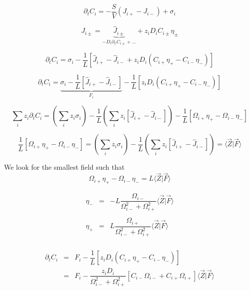 \documentclass[aps,12pt]{revtex4}
\begin{document}
\begin{equation}
	\partial_t C_i = -\dfrac{S}{V}(J_{i+}-J_{i-}) + \sigma_i
\end{equation}

\begin{equation}
	J_{i\pm} = \underbrace{\hat J_{i\pm}}_{-D_i \partial_x C_{i\pm}+\ldots} + z_i D_i C_{i\pm} \eta_\pm
\end{equation}

\begin{equation}
	\partial_t C_i = \sigma_i -\dfrac{1}{L} \left[ \hat J_{i+}- \hat J_{i-} + z_i D_i (C_{i+} \eta_+ - C_{i-} \eta_-) \right] 
\end{equation}

\begin{equation}
	\partial_t C_i = \underbrace{\sigma_i -\dfrac{1}{L} \left[ \hat J_{i+}- \hat J_{i-} \right]}_{F_i} - \dfrac{1}{L}  \left[ z_i D_i (C_{i+} \eta_+ - C_{i-} \eta_-) \right] 
\end{equation}


\begin{equation}
	\sum_i z_i \partial_t C_i = \left(\sum_i z_i \sigma_i\right) 
	-\dfrac{1}{L} \left( \sum_i z_i\left[ \hat J_{i+}- \hat J_{i-} \right]  \right)
	- \dfrac{1}{L}  \left[ \Omega_{i+} \eta_+ - \Omega_{i-} \eta_- \right] 
\end{equation}

\begin{equation}
	\dfrac{1}{L}  \left[ \Omega_{i+} \eta_+ - \Omega_{i-} \eta_- \right]  =
	\left(\sum_i z_i \sigma_i\right) 
	-\dfrac{1}{L} \left( \sum_i z_i\left[ \hat J_{i+}- \hat J_{i-} \right]  \right)
	= \langle \vec Z \vert \vec F \rangle
\end{equation}

 
We look for the smallest field such that 
\begin{equation}
\Omega_{i+} \eta_+ - \Omega_{i-} \eta_- = L \langle \vec Z \vert \vec F \rangle
\end{equation}

\begin{equation}
\begin{array}{rcl}
	\eta_- & = & - L \dfrac{\Omega_{i-}}{ \Omega_{i-}^2 + \Omega_{i+}^2} \langle \vec Z \vert \vec F \rangle \\
	\\
 	\eta_+ & = &  L \dfrac{\Omega_{i+}}{ \Omega_{i-}^2 + \Omega_{i+}^2} \langle \vec Z \vert \vec F \rangle \\
\end{array}
\end{equation}


\begin{equation}
\begin{array}{rcl}
\partial_t C_i & = & F_i 
- \dfrac{1}{L}  \left[ z_i D_i (C_{i+} \eta_+ - C_{i-} \eta_-) \right] \\
& = & F_i - \dfrac{z_i D_i }{ \Omega_{i-}^2 + \Omega_{i+}^2 } \left[ C_{i-} \Omega_{i-} + C_{i+} \Omega_{i+} \right] \langle \vec Z \vert \vec F \rangle
\end{array}
\end{equation}
\end{document}
